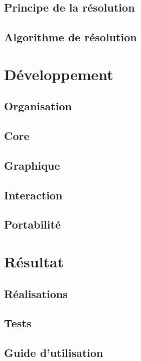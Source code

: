 \documentclass[a4paper,10pt]{report}
\begin{document}
\chapter{Principe de la résolution}

\chapter{Algorithme de résolution}


\part{Développement}
\chapter{Organisation}

\chapter{Core}\label{ch6}

\chapter{Graphique}

\chapter{Interaction}

\chapter{Portabilité}


\part{Résultat}
\chapter{Réalisations}

\chapter{Tests}\label{Tests}


\appendix
\chapter*{Guide d'utilisation}


\listoffigures
\listoftables
\lstlistoflistings

\printindex
\end{document}
